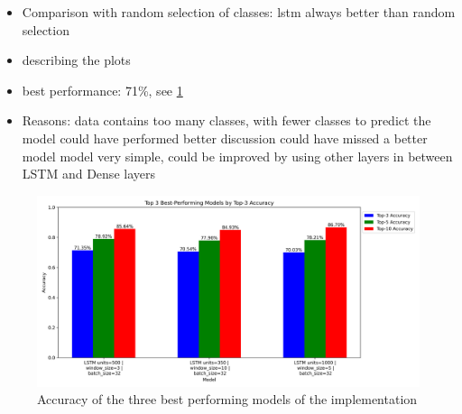 \begin{itemize}
    \item Comparison with random selection of classes: lstm always better than random selection
    \item describing the plots
    \item best performance: 71\%, see \cref{fig:top3_best_models}
    \item Reasons:
    \subitem data contains too many classes, with fewer classes to predict the model could have performed better
    \subitem discussion could have missed a better model
    \subitem model very simple, could be improved by using other layers in between LSTM and Dense layers
\end{itemize}

\begin{figure}[h!]
    \centering
    \includegraphics[scale=0.4]{images/top3_best_models.png}
    \caption{Accuracy of the three best performing models of the implementation}
    \label{fig:top3_best_models}
\end{figure}

